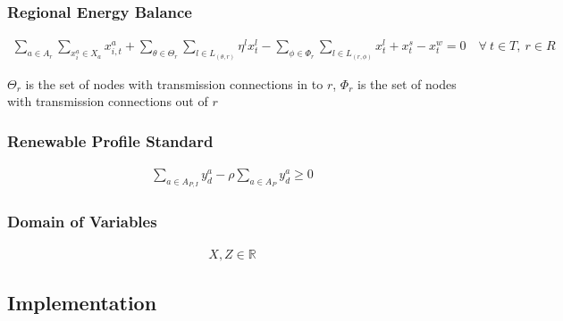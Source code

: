 \documentclass[12pt]{article}
\begin{document}
\subsubsection{Regional Energy Balance}

\begin{gather}
	\sum_{a \in A_r}\sum_{x^a_i \in X_a} x^a_{i, t} + \sum_{\theta \in \Theta_r}\sum_{l \in L_{(\theta, r)}} \eta^lx^l_{t} - \sum_{\phi \in \Phi_r}\sum_{l \in L_{(r, \phi)}} x^l_{t} + x^s_t - x^w_t = 0 \quad \forall\ t\in T,\ r \in R
\end{gather}

$\Theta_r$ is the set of nodes with transmission connections in to $r$, $\Phi_r$ is the set of nodes with transmission connections out of $r$

\subsubsection{Renewable Profile Standard}

\begin{gather}
	\sum_{a \in A_{P, I}} y^a_d - \rho\sum_{a \in A_P} y^a_d \geq 0
\end{gather}

\subsubsection{Domain of Variables}

\begin{gather}
	X, Z \in \mathbb{R}
\end{gather}

\subsection{Implementation}
\end{document}
